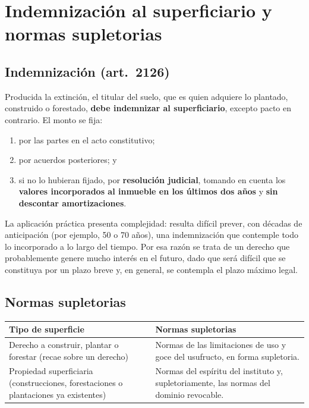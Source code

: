 \documentclass[12pt,oneside]{book}
\begin{document}
\section{Indemnización al superficiario y normas supletorias}

\subsection{Indemnización (art.~2126)}

\begin{important}
Producida la extinción, el titular del suelo, que es quien adquiere lo plantado, construido o forestado, \textbf{debe indemnizar al superficiario}, excepto pacto en contrario. El monto se fija:
\begin{enumerate}[label=(\alph*)]
    \item por las partes en el acto constitutivo;
    \item por acuerdos posteriores; y
    \item si no lo hubieran fijado, por \textbf{resolución judicial}, tomando en cuenta los \textbf{valores incorporados al inmueble en los últimos dos años} y \textbf{sin descontar amortizaciones}.
\end{enumerate}
\end{important}

La aplicación práctica presenta complejidad: resulta difícil prever, con décadas de anticipación (por ejemplo, 50 o 70 años), una indemnización que contemple todo lo incorporado a lo largo del tiempo. Por esa razón se trata de un derecho que probablemente genere mucho interés en el futuro, dado que será difícil que se constituya por un plazo breve y, en general, se contempla el plazo máximo legal.

\subsection{Normas supletorias}

\begin{table}[H]
\centering
\begin{tabularx}{\textwidth}{@{}>{\raggedright\arraybackslash}p{}>{\raggedright\arraybackslash}X@{}}
\toprule
\textbf{Tipo de superficie} & \textbf{Normas supletorias} \\
\midrule
Derecho a construir, plantar o forestar (recae sobre un derecho) & Normas de las limitaciones de uso y goce del usufructo, en forma supletoria. \\
Propiedad superficiaria (construcciones, forestaciones o plantaciones ya existentes) & Normas del espíritu del instituto y, supletoriamente, las normas del dominio revocable. \\
\bottomrule
\end{tabularx}
\end{table}
\end{document}
